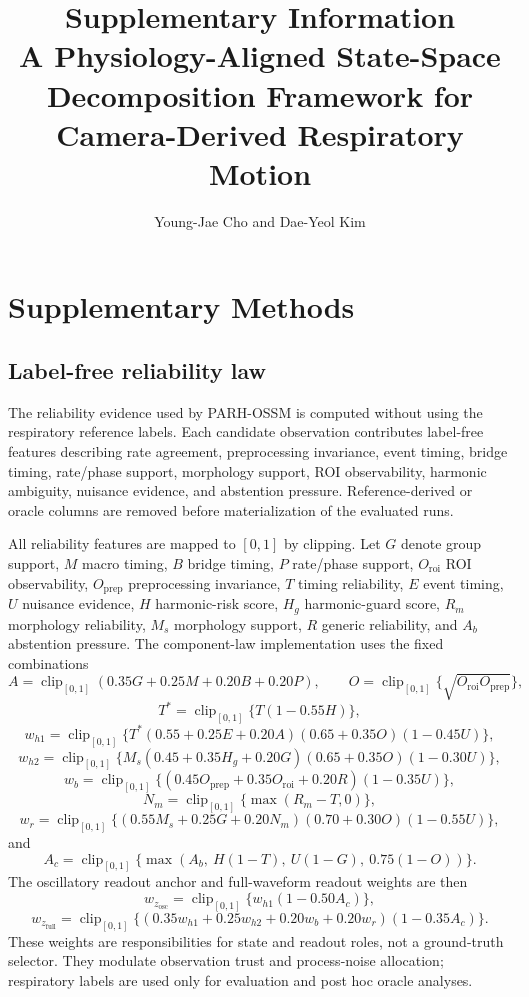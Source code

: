 \documentclass[10pt]{article}
\title{Supplementary Information\\
A Physiology-Aligned State-Space Decomposition Framework for Camera-Derived Respiratory Motion}
\author{Young-Jae Cho and Dae-Yeol Kim}
\date{}
\newcommand{\clip}{\operatorname{clip}_{[0,1]}}
\begin{document}
\maketitle

\section*{Supplementary Methods}

\subsection*{Label-free reliability law}
The reliability evidence used by PARH-OSSM is computed without using the
respiratory reference labels. Each candidate observation contributes
label-free features describing rate agreement, preprocessing invariance,
event timing, bridge timing, rate/phase support, morphology support, ROI
observability, harmonic ambiguity, nuisance evidence, and abstention pressure.
Reference-derived or oracle columns are removed before materialization of the
evaluated runs.

All reliability features are mapped to $[0,1]$ by clipping. Let $G$ denote
group support, $M$ macro timing, $B$ bridge timing, $P$ rate/phase support,
$O_{\mathrm{roi}}$ ROI observability, $O_{\mathrm{prep}}$ preprocessing
invariance, $T$ timing reliability, $E$ event timing, $U$ nuisance evidence,
$H$ harmonic-risk score, $H_g$ harmonic-guard score, $R_m$ morphology
reliability, $M_s$ morphology support, $R$ generic reliability, and $A_b$
abstention pressure. The component-law implementation uses the fixed
combinations
\[
A=\clip(0.35G+0.25M+0.20B+0.20P),\qquad
O=\clip\{\sqrt{O_{\mathrm{roi}}O_{\mathrm{prep}}}\},
\]
\[
T^\ast=\clip\{T(1-0.55H)\},
\]
\[
w_{h1}=\clip\{T^\ast(0.55+0.25E+0.20A)(0.65+0.35O)(1-0.45U)\},
\]
\[
w_{h2}=\clip\{M_s(0.45+0.35H_g+0.20G)(0.65+0.35O)(1-0.30U)\},
\]
\[
w_b=\clip\{(0.45O_{\mathrm{prep}}+0.35O_{\mathrm{roi}}+0.20R)(1-0.35U)\},
\]
\[
N_m=\clip\{\max(R_m-T,0)\},
\]
\[
w_r=\clip\{(0.55M_s+0.25G+0.20N_m)(0.70+0.30O)(1-0.55U)\},
\]
and
\[
A_c=\clip\{\max(A_b,\ H(1-T),\ U(1-G),\ 0.75(1-O))\}.
\]
The oscillatory readout anchor and full-waveform readout weights are then
\[
w_{z_{\mathrm{osc}}}=\clip\{w_{h1}(1-0.50A_c)\},
\]
\[
w_{z_{\mathrm{full}}}=\clip\{(0.35w_{h1}+0.25w_{h2}+0.20w_b+0.20w_r)(1-0.35A_c)\}.
\]
These weights are responsibilities for state and readout roles, not a
ground-truth selector. They modulate observation trust and process-noise
allocation; respiratory labels are used only for evaluation and post hoc
oracle analyses.
\end{document}
